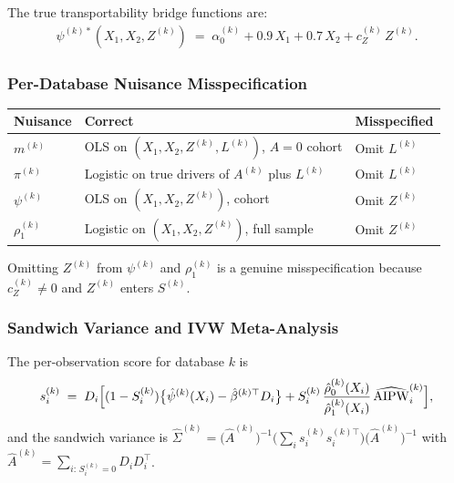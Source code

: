 The true transportability bridge functions are:
\begin{align}
  \psi^{(k)*}(X_1,X_2,Z^{(k)})
  \;=\; \alpha_0^{(k)} + 0.9\,X_1 + 0.7\,X_2 + c_Z^{(k)}\,Z^{(k)}.
\end{align}

\subsubsection*{Per-Database Nuisance Misspecification}

\begin{center}
\begin{tabular}{lll}
  \toprule
  \textbf{Nuisance} & \textbf{Correct} & \textbf{Misspecified} \\
  \midrule
  $m^{(k)}$      & OLS on $(X_1,X_2,Z^{(k)},L^{(k)})$, $A=0$ cohort
                 & Omit $L^{(k)}$ \\
  $\pi^{(k)}$    & Logistic on true drivers of $A^{(k)}$ plus $L^{(k)}$
                 & Omit $L^{(k)}$ \\
  $\psi^{(k)}$   & OLS on $(X_1,X_2,Z^{(k)})$, cohort
                 & Omit $Z^{(k)}$ \\
  $\rho_1^{(k)}$ & Logistic on $(X_1,X_2,Z^{(k)})$, full sample
                 & Omit $Z^{(k)}$ \\
  \bottomrule
\end{tabular}
\end{center}

Omitting $Z^{(k)}$ from $\psi^{(k)}$ and $\rho_1^{(k)}$ is a genuine
misspecification because $c_Z^{(k)} \neq 0$ and $Z^{(k)}$ enters $S^{(k)}$.

\subsubsection*{Sandwich Variance and IVW Meta-Analysis}

The per-observation score for database $k$ is
\begin{align}
  s_i^{(k)} \;=\; D_i\Bigl[
    (1-S_i^{(k)})\bigl\{\hat\psi^{(k)}(X_i)
      - \hat\beta^{(k)\top} D_i\bigr\}
    + S_i^{(k)}\,\frac{\hat\rho_0^{(k)}(X_i)}{\hat\rho_1^{(k)}(X_i)}\,
      \widehat{\mathrm{AIPW}}_i^{(k)}
  \Bigr],
\end{align}
and the sandwich variance is
$\widehat{\Sigma}^{(k)} =
\bigl(\hat{A}^{(k)}\bigr)^{-1}
\bigl(\sum_i s_i^{(k)}s_i^{(k)\top}\bigr)
\bigl(\hat{A}^{(k)}\bigr)^{-1}$
with $\hat{A}^{(k)} = \sum_{i:\,S_i^{(k)}=0} D_i D_i^\top$.

